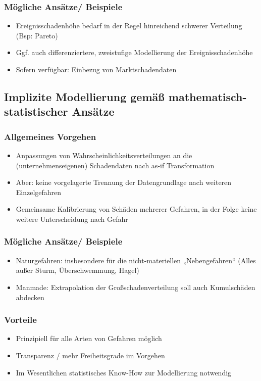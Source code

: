 \documentclass[12pt]{report}
\theoremstyle{dotless}
\theoremstyle{definition}
\begin{document}
\subsubsection{Mögliche Ansätze/ Beispiele}
\begin{itemize}
\item Ereignisschadenhöhe bedarf in der Regel hinreichend schwerer Verteilung (Bsp: Pareto)
\item Ggf. auch differenziertere, zweistufige Modellierung der Ereignisschadenhöhe
\item Sofern verfügbar: Einbezug von Marktschadendaten
\end{itemize}


\subsection{Implizite Modellierung gemäß mathematisch-statistischer Ansätze}

\subsubsection{Allgemeines Vorgehen}
\begin{itemize}
\item Anpassungen von Wahrscheinlichkeitsverteilungen an die (unternehmenseigenen)
Schadendaten nach as-if Transformation
\item Aber: keine vorgelagerte Trennung der Datengrundlage nach weiteren Einzelgefahren
\item Gemeinsame Kalibrierung von Schäden mehrerer Gefahren, in der Folge keine weitere Unterscheidung nach Gefahr
\end{itemize}

\subsubsection{Mögliche Ansätze/ Beispiele}
\begin{itemize}
\item Naturgefahren: insbesondere für die nicht-materiellen „Nebengefahren“ (Alles außer Sturm, Überschwemmung, Hagel)
\item Manmade: Extrapolation der Großschadenverteilung soll auch Kumulschäden
abdecken
\end{itemize}

\subsubsection{Vorteile}
\begin{itemize}
\item Prinzipiell für alle Arten von Gefahren möglich
\item Transparenz / mehr Freiheitsgrade im Vorgehen
\item Im Wesentlichen statistisches Know-How zur Modellierung notwendig
\end{itemize}
\end{document}
